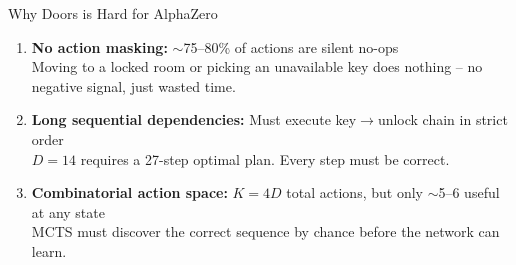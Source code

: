 \documentclass[aspectratio=169, 10pt]{beamer}
\begin{document}
\begin{frame}{Why Doors is Hard for AlphaZero}

\begin{enumerate}
  \item \textbf{No action masking:} $\sim$75--80\% of actions are \alert{silent no-ops}\\
    {\small Moving to a locked room or picking an unavailable key does nothing -- no negative signal, just wasted time.}

  \vspace{0.4cm}
  \item \textbf{Long sequential dependencies:} Must execute key$\to$unlock chain in strict order\\
    {\small $D=14$ requires a 27-step optimal plan. Every step must be correct.}

  \vspace{0.4cm}
  \item \textbf{Combinatorial action space:} $K = 4D$ total actions, but only $\sim$5--6 useful at any state\\
    {\small MCTS must discover the correct sequence by chance before the network can learn.}
\end{enumerate}

\vspace{0.4cm}
\begin{center}
\end{center}
\end{frame}
\end{document}
